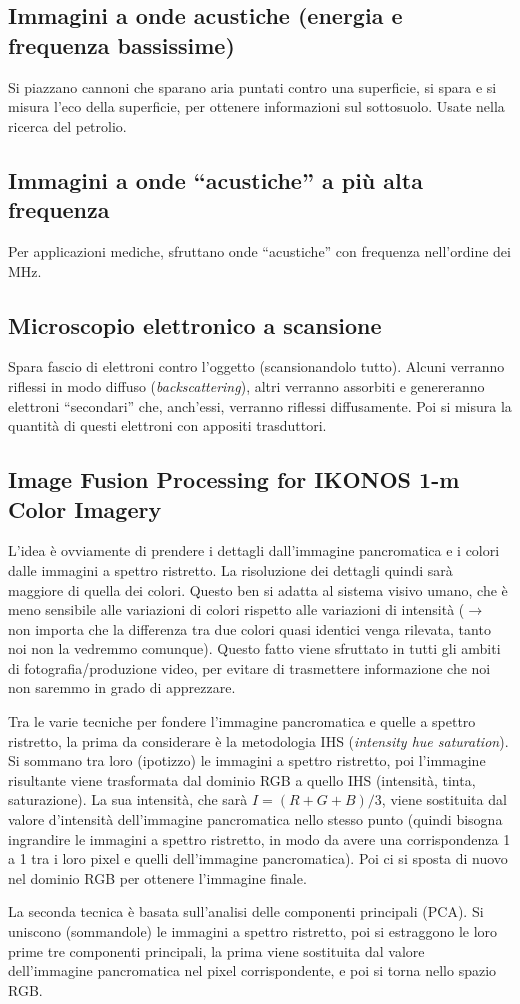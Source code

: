 \documentclass[a4paper,11pt]{article}
\begin{document}
\subsection{Immagini a onde acustiche (energia e frequenza bassissime)}
Si piazzano cannoni che sparano aria puntati contro una superficie, si spara e si misura l'eco della superficie, per ottenere informazioni sul sottosuolo. Usate nella ricerca del petrolio.

\subsection{Immagini a onde ``acustiche'' a più alta frequenza}
Per applicazioni mediche, sfruttano onde ``acustiche'' con frequenza nell'ordine dei MHz.

\subsection{Microscopio elettronico a scansione}
Spara fascio di elettroni contro l'oggetto (scansionandolo tutto). Alcuni verranno riflessi in modo diffuso (\textit{backscattering}),
altri verranno assorbiti e genereranno elettroni ``secondari'' che, anch'essi, verranno riflessi diffusamente. Poi si misura la quantità di questi elettroni con appositi trasduttori.

\subsection{Image Fusion Processing for IKONOS 1-m Color Imagery}
L'idea è ovviamente di prendere i dettagli dall'immagine pancromatica e i colori dalle immagini a spettro ristretto.
La risoluzione dei dettagli quindi sarà maggiore di quella dei colori. Questo ben si adatta al sistema visivo
umano, che è meno sensibile alle variazioni di colori rispetto alle variazioni di intensità ($\rightarrow$ non importa che la differenza
tra due colori quasi identici venga rilevata, tanto noi non la vedremmo comunque).
Questo fatto viene sfruttato in tutti gli ambiti di fotografia/produzione video, per evitare di trasmettere informazione che noi non saremmo in grado di apprezzare.
\par
Tra le varie tecniche per fondere l'immagine pancromatica e quelle a spettro ristretto, la prima da considerare è la metodologia IHS (\textit{intensity hue saturation}).
Si sommano tra loro (ipotizzo) le immagini a spettro ristretto, poi l'immagine risultante viene trasformata dal dominio RGB a quello IHS (intensità, tinta, saturazione).
La sua intensità, che sarà $I = (R+G+B)/3$, viene sostituita dal valore d'intensità dell'immagine pancromatica nello stesso punto (quindi bisogna ingrandire le immagini
a spettro ristretto, in modo da avere una corrispondenza 1 a 1 tra i loro pixel e quelli dell'immagine pancromatica). Poi ci si sposta di nuovo nel dominio RGB per ottenere l'immagine finale.
\par
La seconda tecnica è basata sull'analisi delle componenti principali (PCA). Si uniscono (sommandole) le immagini a spettro ristretto, poi si estraggono le loro prime tre componenti
principali, la prima viene sostituita dal valore dell'immagine pancromatica nel pixel corrispondente, e poi si torna nello spazio RGB.
\end{document}
